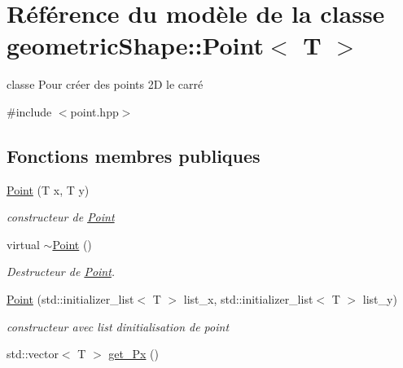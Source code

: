 \hypertarget{classgeometric_shape_1_1_point}{}\section{Référence du modèle de la classe geometric\+Shape\+:\+:Point$<$ T $>$}
\label{classgeometric_shape_1_1_point}


classe Pour créer des points 2D le carré  




{\ttfamily \#include $<$point.\+hpp$>$}

\subsection*{Fonctions membres publiques}
\begin{DoxyCompactItemize}
\item 
\hyperlink{classgeometric_shape_1_1_point_a48370365295e37fbe37ef6b02ca3c2fc}{Point} (T x, T y)
\begin{DoxyCompactList}\small\item\em constructeur de \hyperlink{classgeometric_shape_1_1_point}{Point} \end{DoxyCompactList}\item 
\mbox{\label{classgeometric_shape_1_1_point_a6244b9b50d9633c5d5cf1911ffbb5d07}} 
virtual \hyperlink{classgeometric_shape_1_1_point_a6244b9b50d9633c5d5cf1911ffbb5d07}{$\sim$\+Point} ()
\begin{DoxyCompactList}\small\item\em Destructeur de \hyperlink{classgeometric_shape_1_1_point}{Point}. \end{DoxyCompactList}\item 
\hyperlink{classgeometric_shape_1_1_point_a68d7c17f7593f7ab9e564830b6ad8466}{Point} (std\+::initializer\+\_\+list$<$ T $>$ list\+\_\+x, std\+::initializer\+\_\+list$<$ T $>$ list\+\_\+y)
\begin{DoxyCompactList}\small\item\em constructeur avec list d\textquotesingle{}initialisation de point \end{DoxyCompactList}\item 
\mbox{\label{classgeometric_shape_1_1_point_ad3ff8341f46dd13606e9e28f79238422}} 
std\+::vector$<$ T $>$ \hyperlink{classgeometric_shape_1_1_point_ad3ff8341f46dd13606e9e28f79238422}{get\+\_\+\+Px} ()

\end{DoxyCompactItemize}
